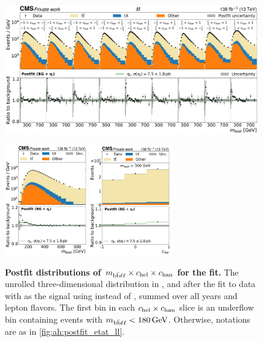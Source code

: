 \begin{figure}[p]
    \centering
    \includegraphics[width=0.99\textwidth]{figures/ah/prepost/EtaT_mbbllspin_fit_s_ll_run2_both.pdf}
    \caption{
        \label{fig:ah:postfit_mbbll_3D}
        \textbf{Postfit distributions of $m_{\mathrm{b\bar{b}\ell\ell}} \times c_{\mathrm{hel}} \times c_{\mathrm{han}}$ for the \etat fit.} The unrolled three-dimensional distribution in \mbbll, \chel and \chan after the fit to data with \etat as the signal using \mbbll instead of \mtt, summed over all years and lepton flavors. The first \mbbll bin in each $c_{\mathrm{hel}} \times c_{\mathrm{han}}$ slice is an underflow bin containing events with $\mbbll < \SI{180}{\GeV}$. Otherwise, notations are as in \cref{fig:ah:postfit_etat_ll}.
    }
    \vspace{1cm}
    \includegraphics[width=0.32\textwidth]{figures/ah/prepost/EtaT_mbbllspin_fit_s_ll_run2_both_mbbll.pdf}
    \hfill
    \includegraphics[width=0.32\textwidth]{figures/ah/prepost/EtaT_mbbllspin_fit_s_ll_run2_both_chel_mbblllt300.pdf}

\end{figure}
